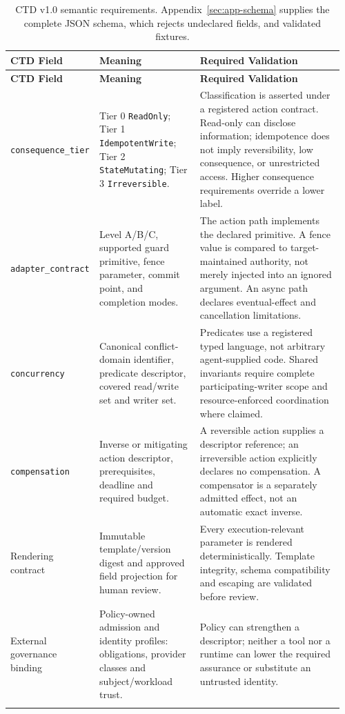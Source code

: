 \small
\begin{longtable}{@{}L{0.23\linewidth}L{0.30\linewidth}L{0.43\linewidth}@{}}
\toprule
\textbf{CTD Field} & \textbf{Meaning} & \textbf{Required Validation}\\
\midrule
\endfirsthead
\toprule
\textbf{CTD Field} & \textbf{Meaning} & \textbf{Required Validation}\\
\midrule
\endhead
\texttt{consequence\_tier} & Tier 0 \texttt{ReadOnly}; Tier 1 \texttt{IdempotentWrite}; Tier 2 \texttt{StateMutating}; Tier 3 \texttt{Irreversible}. & Classification is asserted under a registered action contract. Read-only can disclose information; idempotence does not imply reversibility, low consequence, or unrestricted access. Higher consequence requirements override a lower label.\\
\texttt{adapter\_contract} & Level A/B/C, supported guard primitive, fence parameter, commit point, and completion modes. & The action path implements the declared primitive. A fence value is compared to target-maintained authority, not merely injected into an ignored argument. An async path declares eventual-effect and cancellation limitations.\\
\texttt{concurrency} & Canonical conflict-domain identifier, predicate descriptor, covered read/write set and writer set. & Predicates use a registered typed language, not arbitrary agent-supplied code. Shared invariants require complete participating-writer scope and resource-enforced coordination where claimed.\\
\texttt{compensation} & Inverse or mitigating action descriptor, prerequisites, deadline and required budget. & A reversible action supplies a descriptor reference; an irreversible action explicitly declares no compensation. A compensator is a separately admitted effect, not an automatic exact inverse.\\
Rendering contract & Immutable template/version digest and approved field projection for human review. & Every execution-relevant parameter is rendered deterministically. Template integrity, schema compatibility and escaping are validated before review.\\
External governance binding & Policy-owned admission and identity profiles: obligations, provider classes and subject/workload trust. & Policy can strengthen a descriptor; neither a tool nor a runtime can lower the required assurance or substitute an untrusted identity.\\
\bottomrule
\caption{CTD v1.0 semantic requirements. Appendix~\ref{sec:app-schema} supplies the complete JSON schema, which rejects undeclared fields, and validated fixtures.}
\label{tab:ctd}
\end{longtable}
\normalsize

